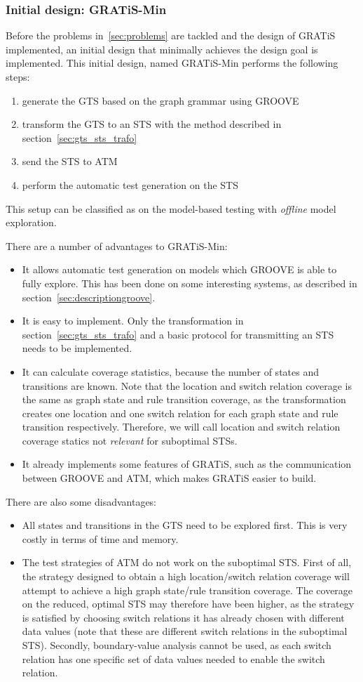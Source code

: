 \subsubsection{Initial design: GRATiS-Min}\label{sec:init_design}
Before the problems in~\ref{sec:problems} are tackled and the design of GRATiS implemented, an initial design that minimally achieves the design goal is implemented. This initial design, named GRATiS-Min performs the following steps:
\begin{enumerate}
  \item generate the GTS based on the graph grammar using GROOVE
  \item transform the GTS to an STS with the method described in section~\ref{sec:gts_sts_trafo}
  \item send the STS to ATM
  \item perform the automatic test generation on the STS
\end{enumerate}
This setup can be classified as on the model-based testing with \textit{offline} model exploration.

There are a number of advantages to GRATiS-Min:
\begin{itemize}
  \item It allows automatic test generation on models which GROOVE is able to fully explore. This has been done on some interesting systems, as described in section~\ref{sec:descriptiongroove}.
  \item It is easy to implement. Only the transformation in section~\ref{sec:gts_sts_trafo} and a basic protocol for transmitting an STS needs to be implemented.
  \item It can calculate coverage statistics, because the number of states and transitions are known. Note that the location and switch relation coverage is the same as graph state and rule transition coverage, as the transformation creates one location and one switch relation for each graph state and rule transition respectively. Therefore, we will call location and switch relation coverage statics not \textit{relevant} for suboptimal STSs.
  \item It already implements some features of GRATiS, such as the communication between GROOVE and ATM, which makes GRATiS easier to build.
\end{itemize}
There are also some disadvantages:
\begin{itemize}
  \item All states and transitions in the GTS need to be explored first. This is very costly in terms of time and memory.
  \item The test strategies of ATM do not work on the suboptimal STS. First of all, the strategy designed to obtain a high location/switch relation coverage will attempt to achieve a high graph state/rule transition coverage. The coverage on the reduced, optimal STS may therefore have been higher, as the strategy is satisfied by choosing switch relations it has already chosen with different data values (note that these are different switch relations in the suboptimal STS). Secondly, boundary-value analysis cannot be used, as each switch relation has one specific set of data values needed to enable the switch relation.
\end{itemize}

